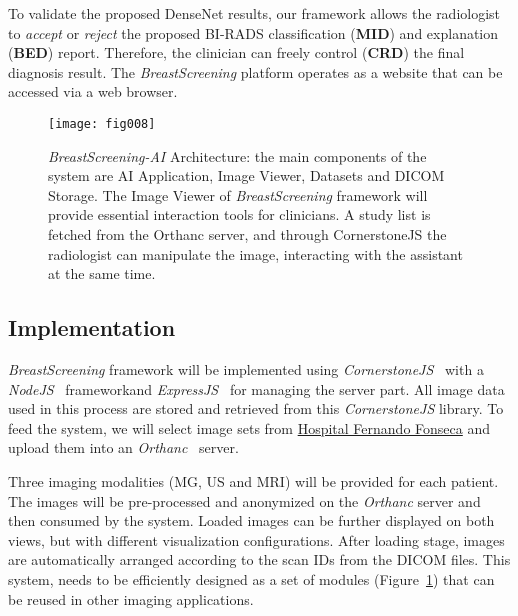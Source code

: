 To validate the proposed DenseNet results, our framework allows the radiologist to {\it accept} or {\it reject} the proposed BI-RADS classification ({\bf MID}) and explanation ({\bf BED}) report.
Therefore, the clinician can freely control ({\bf CRD}) the final diagnosis result.
The {\it BreastScreening} platform operates as a website that can be accessed via a web browser.

\begin{figure}[htbp]
\centering
\texttt{[image: fig008]}
\caption{{\it BreastScreening-AI} Architecture: the main components of the system are AI Application, Image Viewer, Datasets and DICOM Storage. The Image Viewer of {\it BreastScreening} framework will provide essential interaction tools for clinicians. A study list is fetched from the Orthanc server, and through CornerstoneJS the radiologist can manipulate the image, interacting with the assistant at the same time.}
\label{fig:fig008}
\end{figure}

\subsection{Implementation}
\label{sec:sec00603}

{\it BreastScreening} framework will be implemented using {\it CornerstoneJS}\footnotemark[2]~\cite{urban2017lesiontracker} with a {\it NodeJS}~\cite{10.5555/3002437, drnasin2017javascript} framework\footnotemark[3] and {\it ExpressJS}\footnotemark[4]~\cite{10.1117/12.2285952} for managing the server part.
All image data used in this process are stored and retrieved from this {\it CornerstoneJS} library.
To feed the system, we will select image sets from \hyperlink{https://hff.min-saude.pt/}{Hospital Fernando Fonseca} and upload them into an {\it Orthanc}~\cite{Jodogne2018} server.

Three imaging modalities (MG, US and MRI) will be provided for each patient.
The images will be pre-processed and anonymized on the {\it Orthanc} server and then consumed by the system.
Loaded images can be further displayed on both views, but with different visualization configurations.
After loading stage, images are automatically arranged according to the scan IDs from the DICOM files.
This system, needs to be efficiently designed as a set of modules (Figure~\ref{fig:fig008}) that can be reused in other imaging applications.



